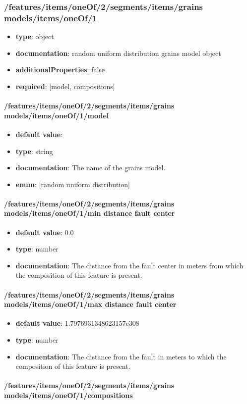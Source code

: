 \subsubsection{/features/items/oneOf/2/segments/items/grains models/items/oneOf/1}
\begin{itemize}\item {\bf type}: object
\item {\bf documentation}: random uniform distribution grains model object
\item {\bf additionalProperties}: false
\item {\bf required}: [model, compositions]\end{itemize}
\paragraph{/features/items/oneOf/2/segments/items/grains models/items/oneOf/1/model}
\begin{itemize}\item {\bf default value}: 
\item {\bf type}: string
\item {\bf documentation}: The name of the grains model.
\item {\bf enum}: [random uniform distribution]\end{itemize}\paragraph{/features/items/oneOf/2/segments/items/grains models/items/oneOf/1/min distance fault center}
\begin{itemize}\item {\bf default value}: 0.0
\item {\bf type}: number
\item {\bf documentation}: The distance from the fault center in meters from which the composition of this feature is present.
\end{itemize}\paragraph{/features/items/oneOf/2/segments/items/grains models/items/oneOf/1/max distance fault center}
\begin{itemize}\item {\bf default value}: 1.7976931348623157e308
\item {\bf type}: number
\item {\bf documentation}: The distance from the fault in meters to which the composition of this feature is present.
\end{itemize}\paragraph{/features/items/oneOf/2/segments/items/grains models/items/oneOf/1/compositions}
